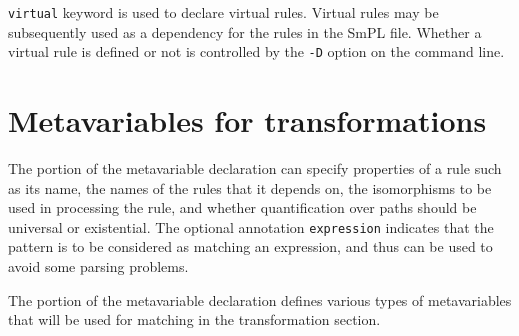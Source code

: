 \texttt{virtual} keyword is used to declare virtual rules. Virtual
rules may be subsequently used as a dependency for the rules in the
SmPL file. Whether a virtual rule is defined or not is controlled by
the \texttt{-D} option on the command line.


\section{Metavariables for transformations}

The  portion of the metavariable declaration can specify
properties of a rule such as its name, the names of the rules that it
depends on, the isomorphisms to be used in processing the rule, and whether
quantification over paths should be universal or existential.  The optional
annotation {\tt expression} indicates that the pattern is to be considered
as matching an expression, and thus can be used to avoid some parsing
problems.

The  portion of the metavariable declaration defines various
types of metavariables that will be used for matching in the transformation
section.

\begin{grammar}







\end{grammar}

